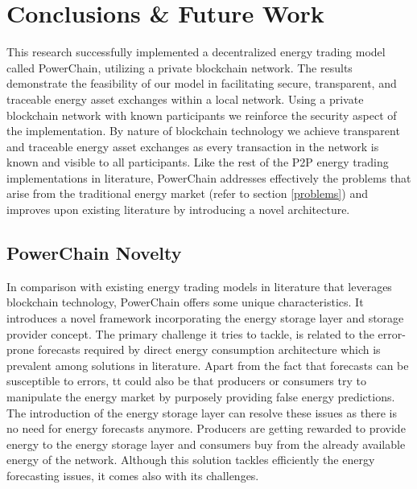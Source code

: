 \chapter{Conclusions \& Future Work} \label{conclusions}
This research successfully implemented a decentralized energy trading model called PowerChain, utilizing a private blockchain network. 
The results demonstrate the feasibility of our model in facilitating secure, transparent, and traceable energy asset exchanges within a local network.
Using a private blockchain network with known participants we reinforce the security aspect of the implementation. By nature of blockchain technology we
achieve transparent and traceable energy asset exchanges as every transaction in the network is known and visible to all participants. Like the rest of the P2P
energy trading implementations in literature, PowerChain addresses effectively the problems that arise from the traditional energy market (refer to section \ref{problems})
and improves upon existing literature by introducing a novel architecture.

\section{PowerChain Novelty}
In comparison with existing energy trading models in literature that leverages blockchain technology, PowerChain offers some unique characteristics.
It introduces a novel framework incorporating the energy storage layer and storage provider concept. 
The primary challenge it tries to tackle, is related to the error-prone forecasts required by direct energy consumption architecture which is prevalent among solutions in literature. 
Apart from the fact that forecasts can be susceptible to errors, tt could also be that producers or consumers try to manipulate the energy market by purposely 
providing false energy predictions. The introduction of the energy storage layer can resolve these issues as there is no need for energy forecasts anymore.
Producers are getting rewarded to provide energy to the energy storage layer and consumers buy from the already available energy of the network. Although this solution
tackles efficiently the energy forecasting issues, it comes also with its challenges. 

